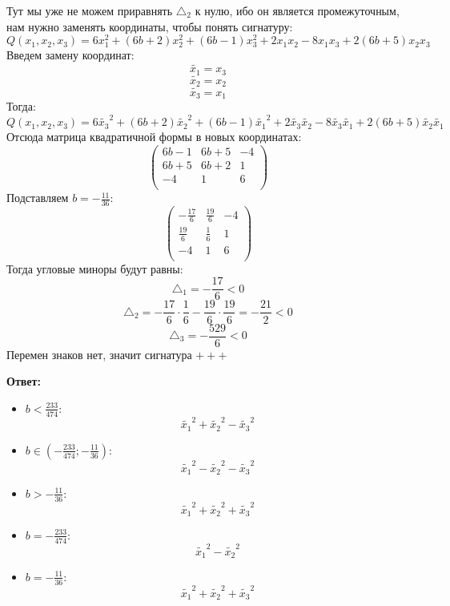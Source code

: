 \documentclass[a4paper,12pt]{article}
\begin{document}
Тут мы уже не можем приравнять $\triangle_2$ к нулю, ибо он является промежуточным, нам нужно заменять координаты, чтобы понять сигнатуру: 
\[
Q(x_1, x_2, x_3) = 6x_1^2 + (6b+2)x_2^2 + (6b-1)x_3^2 + 2x_1x_2 - 8x_1x_3 + 2(6b+5)x_2x_3
\]
Введем замену координат:
\[
\widetilde{x_1} = x_3
\]
\[
\widetilde{x_2} = x_2
\]
\[
\widetilde{x_3} = x_1
\]
Тогда:
\[
Q(x_1,x_2, x_3) = 6\widetilde{x_3} ^2 + (6b+2)\widetilde{x_2} ^2 + (6b-1)\widetilde{x_1} ^2 + 2\widetilde{x_3} \widetilde{x_2}  - 8\widetilde{x_3}\widetilde{x_1}  + 2(6b+5)\widetilde{x_2} \widetilde{x_1} 
\]
Отсюда матрица квадратичной формы в новых координатах:
\[
\begin{pmatrix}
6b-1 & 6b+5& -4 \\
6b+5 & 6b+2 & 1 \\
-4 & 1 & 6 \\
\end{pmatrix}
\]
Подставляем $b = -\frac{11}{36}$:
\[
\begin{pmatrix}
-\frac{17}{6} & \frac{19}{6}& -4 \\ 
\frac{19}{6} & \frac{1}{6}& 1 \\
-4 & 1 & 6 \\
\end{pmatrix}
\]
Тогда угловые миноры будут равны:
\[
\triangle_1 = -\frac{17}{6} < 0
\]
\[
\triangle_2 = -\frac{17}{6} \cdot \frac{1}{6} - \frac{19}{6} \cdot \frac{19}{6}  = -\frac{21}{2} < 0 
\]
\[
\triangle_3 = -\frac{529}{6} < 0 
\]
Перемен знаков нет, значит сигнатура $+++$
\clearpage
\begin{center}
\textbf{Ответ: } 
\begin{itemize}
\item
$b < \frac{233}{474}$:
\[
\widetilde{x_1}^2 + \widetilde{x_2}^2  - \widetilde{x_3}^2 
\]
\item
$b \in (-\frac{233}{474}; -\frac{11}{36})$:
\[
\widetilde{x_1}^2  - \widetilde{x_2}^2  - \widetilde{x_3}^2 
\]
\item
$b > -\frac{11}{36}:$
\[
\widetilde{x_1}^2  + \widetilde{x_2}^2  + \widetilde{x_3}^2 
\]
\item
$b = -\frac{233}{474}:$
\[
\widetilde{x_1}^2  - \widetilde{x_2}^2 
\]
\item
$ b = - \frac{11}{36}$:
\[
\widetilde{x_1}^2  +\widetilde{x_2}^2 +\widetilde{x_3}^2 
\]
\end{itemize}
\end{center}
\clearpage
\end{document}

